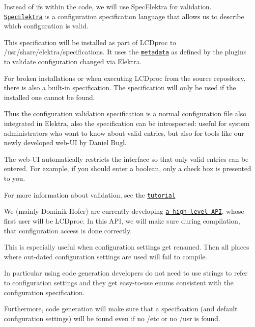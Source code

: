 Instead of {\ttfamily if}s within the code, we will use Spec\+Elektra for validation. \href{https://www.libelektra.org/manpages/elektra-glossary}{\tt Spec\+Elektra} is a configuration specification language that allows us to describe which configuration is valid.

This specification will be installed as part of L\+C\+Dproc to {\ttfamily /usr/share/elektra/specifications}. It uses the \href{https://www.libelektra.org/docgettingstarted/metadata}{\tt metadata} as defined by the plugins to validate configuration changed via Elektra.

For broken installations or when executing L\+C\+Dproc from the source repository, there is also a built-\/in specification. The specification will only be used if the installed one cannot be found.

Thus the configuration validation specification is a normal configuration file also integrated in Elektra, also the specification can be introspected\+: useful for system administrators who want to know about valid entries, but also for tools like our newly developed web-\/\+UI by Daniel Bugl.

The web-\/\+UI automatically restricts the interface so that only valid entries can be entered. For example, if you should enter a boolean, only a check box is presented to you.


\begin{DoxyItemize}
\item For more information about validation, see the \href{https://www.libelektra.org/tutorials/validate-configuration}{\tt tutorial}
\end{DoxyItemize}

We (mainly Dominik Hofer) are currently developing \href{https://www.libelektra.org/decisions/high-level-api}{\tt a high-\/level A\+PI}, whose first user will be L\+C\+Dproc. In this A\+PI, we will make sure during compilation, that configuration access is done correctly.

This is especially useful when configuration settings get renamed. Then all places where out-\/dated configuration settings are used will fail to compile.

In particular using code generation developers do not need to use strings to refer to configuration settings and they get easy-\/to-\/use enums consistent with the configuration specification.

Furthermore, code generation will make sure that a specification (and default configuration settings) will be found even if no {\ttfamily /etc} or no {\ttfamily /usr} is found.

